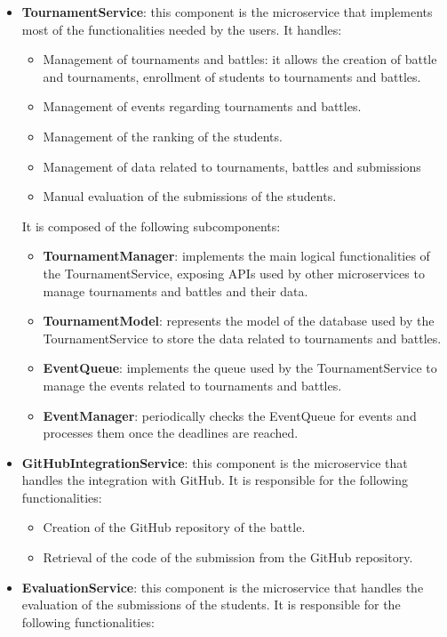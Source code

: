 \begin{itemize}
\begin{itemize}
    \end{itemize}
    \item \textbf{TournamentService}: this component is the microservice that implements most of the functionalities needed by the users. It handles:
    \begin{itemize}
        \item Management of tournaments and battles: it allows the creation of battle and tournaments, enrollment of students to tournaments and battles.
        \item Management of events regarding tournaments and battles.
        \item Management of the ranking of the students.
        \item Management of data related to tournaments, battles and submissions
        \item Manual evaluation of the submissions of the students.
    \end{itemize}
    It is composed of the following subcomponents:
    \begin{itemize}
        \item \textbf{TournamentManager}: implements the main logical functionalities of the TournamentService, exposing APIs used by other microservices to manage tournaments and battles and their data.
        \item \textbf{TournamentModel}: represents the model of the database used by the TournamentService to store the data related to tournaments and battles.
        \item \textbf{EventQueue}: implements the queue used by the TournamentService to manage the events related to tournaments and battles.
        \item \textbf{EventManager}: periodically checks the EventQueue for events and processes them once the deadlines are reached.
    \end{itemize}
    \item \textbf{GitHubIntegrationService}: this component is the microservice that handles the integration with GitHub. It is responsible for the following functionalities:
    \begin{itemize}
        \item Creation of the GitHub repository of the battle.
        \item Retrieval of the code of the submission from the GitHub repository.
    \end{itemize}
    \item \textbf{EvaluationService}: this component is the microservice that handles the evaluation of the submissions of the students. It is responsible for the following functionalities:

\end{itemize}
